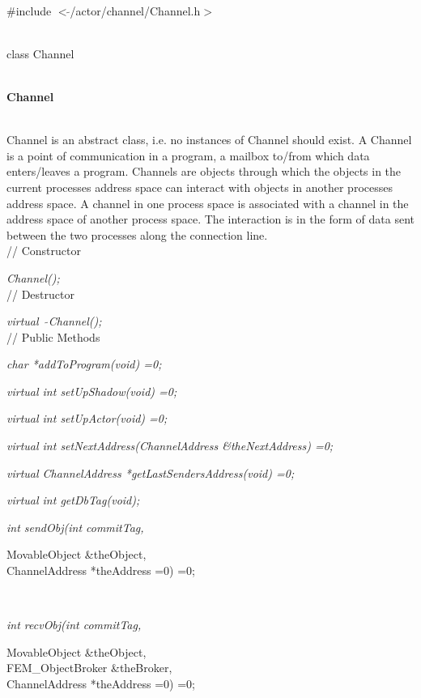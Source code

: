 
   \\
\#include $<\tilde{ }$/actor/channel/Channel.h$>$  


  \\
class Channel 


 \\
{\bf Channel} 


  \\
\indent Channel is an abstract class, i.e. no instances of Channel
should exist. A Channel is a point of communication in a program, a
mailbox to/from which data enters/leaves a program. Channels are
objects through which the objects in the current processes address
space can interact with objects in another processes address space. A
channel in one process space is associated with a channel in the
address space of another process space. The interaction is in the form
of data sent between the two processes along the connection line. \\ 

// Constructor  

{\em Channel();}  \\ 

// Destructor 

{\em virtual~ $\tilde{}$Channel();}\\  

// Public Methods  

{\em char *addToProgram(void) =0;} 

{\em virtual int setUpShadow(void) =0;} 

{\em virtual int setUpActor(void) =0;} 

{\em virtual int setNextAddress(ChannelAddress \&theNextAddress) =0;}

{\em virtual ChannelAddress *getLastSendersAddress(void) =0;}

{\em virtual int getDbTag(void);} 


{\em int sendObj(int commitTag, 

\indent\indent\indent\indent\indent MovableObject \&theObject, \\
\indent\indent\indent\indent\indent ChannelAddress *theAddress =0) =0;}\\
{\em int recvObj(int commitTag, 

\indent\indent\indent\indent\indent MovableObject \&theObject, \\
\indent\indent\indent\indent\indent FEM\_ObjectBroker \&theBroker, \\
\indent\indent\indent\indent\indent ChannelAddress *theAddress =0) =0;}\\
 
